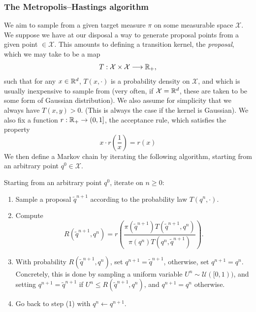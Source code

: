     \subsubsection*{The Metropolis--Hastings algorithm}
     We aim to sample from a given target measure $\pi$ on some measurable space $\mathcal X$. We suppose we have at our disposal a way to generate proposal points from a given point $\in \mathcal X$. This amounts to defining a transition kernel, the \textit{proposal}, which we may take to be a map
     \[T:\mathcal X\times\mathcal X\longrightarrow\mathbb{R}_+,\]
     such that for any $x\in\mathbb{R}^d$, $T(x,\cdot)$ is a probability density on $\mathcal X$, and which is usually inexpensive to sample from (very often, if $\mathcal X=\mathbb{R}^d$, these are taken to be some form of Gaussian distribution). We also assume for simplicity that we always have $T(x,y)>0$. (This is always the case if the kernel is Gaussian).
     We also fix a function $r:\mathbb{R}_+\to(0,1]$, the acceptance rule, which satisfies the property
     \begin{equation}\label{eq:mh_rule}x\cdot r\left(\frac1x\right)=r(x)\end{equation}
     We then define a Markov chain by iterating the following algorithm, starting from an arbitrary point $q^0\in \mathcal X$.

     \begin{algorithm}
        Starting from an arbitrary point $q^0$, iterate on $n\geq 0$:
        \begin{enumerate}[(1)]
            \item Sample a proposal $\tilde q^{n+1}$ according to the probability law $T(q^n,\cdot)$.
            \item Compute\[R(\tilde q^{n+1},q^n)=r\left(\frac{\pi(\tilde q^{n+1})T(\tilde q^{n+1},q^n)}{\pi(q^n)T(q^n,\tilde q^{n+1})}\right).\]
            \item With probability $R(\tilde q^{n+1},q^n)$, set $q^{n+1}=\tilde q^{n+1}$, otherwise, set $q^{n+1}=q^n$. Concretely, this is done by sampling a uniform variable $U^n\sim \mathcal U([0,1))$, and setting $q^{n+1}=\tilde q^{n+1}$ if $U^n \leq R(\tilde q^{n+1},q^n)$, and $q^{n+1}=q^n$ otherwise.
            \item Go back to step (1) with $q^n\leftarrow q^{n+1}$.
        \end{enumerate}
     \end{algorithm}

